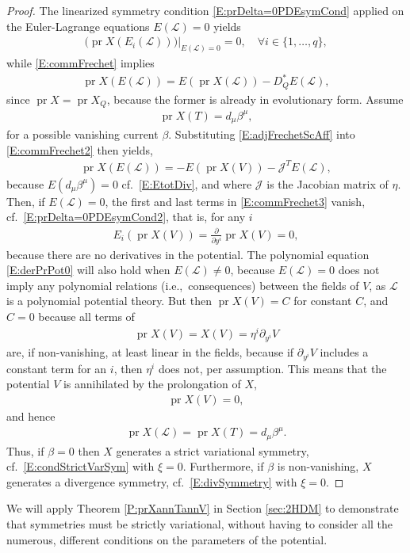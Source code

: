 \documentclass[a4paper,hidelinks, 12pt]{article}
\numberwithin{equation}{section}
\theoremstyle{plain}
\newcommand{\mc}{\mathcal}
\newcommand{\on}{\operatorname}
\begin{document}
\begin{proof}
 The linearized symmetry condition \eqref{E:prDelta=0PDEsymCond}
applied on the Euler-Lagrange equations $E(\mc{L})=0$ yields
\begin{align}\label{E:prDelta=0PDEsymCond2}
	 \big(\on{pr}X(E_i(\mc{L}))\big)|_{E(\mc{L}) = 0}=0, \quad \forall i\in \{1,\ldots,q\},  
\end{align}
while \eqref{E:commFrechet} implies
\begin{align}\label{E:commFrechet2}
	\on{pr}X(E(\mc{L}))= E(\on{pr}X(\mc{L}))-D_Q^\ast E(\mc{L}),
\end{align}
since $\on{pr}X= \on{pr}X_Q$, because the former is already in evolutionary form. Assume 
\begin{align}
\on{pr}X(T)=d_\mu \beta^\mu, 	
\end{align}
for a possible vanishing current $\beta$. Substituting \eqref{E:adjFrechetScAff} into \eqref{E:commFrechet2} then yields, 
\begin{align}\label{E:commFrechet3}
	\on{pr}X(E(\mc{L}))= -E(\on{pr}X(V))-\mc{J}^T E(\mc{L}),
\end{align}
because $E(d_\mu \beta^\mu)=0$ cf.~\eqref{E:EtotDiv}, and
where $\mc{J}$ is the Jacobian matrix of $\eta$.
Then, if $E(\mc{L}) = 0$, the first and last terms in \eqref{E:commFrechet3} vanish, cf.~\eqref{E:prDelta=0PDEsymCond2}, that is, for any $i$
\begin{align}\label{E:derPrPot0}
	E_i(\on{pr}X(V))=\frac{\partial}{\partial y^i}\on{pr}X(V)=0,
\end{align}
because there are no derivatives in the potential. The polynomial equation \eqref{E:derPrPot0} will also hold when $E(\mc{L})\ne 0$, because $E(\mc{L})= 0$ does not imply any polynomial relations (i.e.,~consequences) between the fields of $V$, as $\mc{L}$ is a polynomial potential theory. But then $\on{pr}X(V)=C$ for constant $C$, and $C=0$ because all terms of 
\begin{align}
\on{pr}X(V)=X(V)=\eta^i\partial_{y^i}V	
\end{align}
are, if non-vanishing, at least linear in the fields, because if $\partial_{y^i}V$ includes a constant term for an $i$, then $\eta^i$ does not, per assumption. This means that the potential $V$ is annihilated by 
the prolongation of $X$,
\begin{align}
	\on{pr}X(V)=0, 
\end{align}
  and hence 
	\begin{align}
		\on{pr}X(\mc{L})=\on{pr}X(T)=d_\mu \beta^\mu.
	\end{align}
Thus, if 
 $\beta=0$ then $X$ generates a strict variational symmetry, cf.~\eqref{E:condStrictVarSym} with $\xi=0$.
Furthermore, if $\beta$ is non-vanishing, $X$ generates a divergence symmetry, cf.~\eqref{E:divSymmetry} with $\xi=0$.
\end{proof}
  We will apply Theorem \ref{P:prXannTannV} in Section \ref{sec:2HDM} to demonstrate that symmetries must be strictly variational, without having to consider all the numerous, different conditions on the parameters of the potential. 
\end{document}
